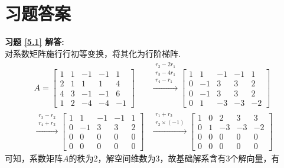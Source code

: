 \section{习题答案}
\textbf{习题 \ref{5.1} 解答:}\\
对系数矩阵施行行初等变换，将其化为行阶梯阵.
\begin{align*}
A= \begin{bmatrix}1&1&-1&-1&1\\2&1&1&1&4\\4&3&-1&-1&6\\1&2&-4&-4&-1\end{bmatrix} &
   \xrightarrow{\begin{matrix}r_2-2r_1\\r_3-4r_1\\r_4-r_1\end{matrix}}
   \begin{bmatrix}1&1&-1&-1&1\\0&-1&3&3&2\\0&-1&3&3&2\\0&1&-3&-3&-2\end{bmatrix} \\
   \xrightarrow{\begin{matrix}r_3-r_2\\r_4+r_2 \end{matrix}}
   \begin{bmatrix}1&1&-1&-1&1\\0&-1&3&3&2\\0&0&0&0&0\\0&0&0&0&0\end{bmatrix} &
   \xrightarrow{\begin{matrix}r_1+r_2\\r_2\times(-1)\end{matrix}}
   \begin{bmatrix}1&0&2&3&3\\0&1&-3&-3&-2\\0&0&0&0&0\\0&0&0&0&0\end{bmatrix}
\end{align*}
可知，系数矩阵$A$的秩为2，解空间维数为3，故基础解系含有3个解向量，有
